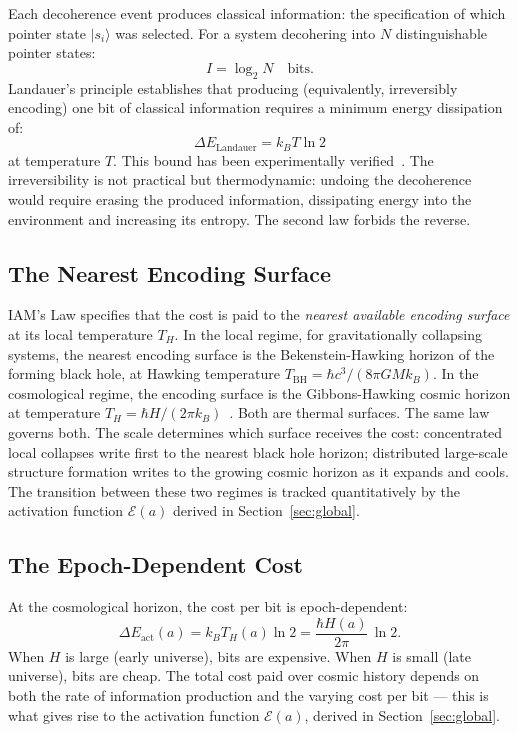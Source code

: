 \documentclass[12pt,a4paper]{article}
\begin{document}
Each decoherence event produces classical information: the specification
of which pointer state $|s_i\rangle$ was selected. For a system
decohering into $N$ distinguishable pointer states:
\begin{equation}
I = \log_2 N \quad \text{bits.}
\label{eq:info_produced}
\end{equation}
Landauer's principle establishes that producing (equivalently,
irreversibly encoding) one bit of classical information requires a
minimum energy dissipation of:
\begin{equation}
\Delta E_\mathrm{Landauer} = k_B T \ln 2
\label{eq:landauer_basic}
\end{equation}
at temperature $T$. This bound has been experimentally
verified~\citep{Berut2012,Jun2014}. The irreversibility is not
practical but thermodynamic: undoing the decoherence would require
erasing the produced information, dissipating energy into the
environment and increasing its entropy. The second law forbids
the reverse.

\subsection{The Nearest Encoding Surface}

IAM's Law specifies that the cost is paid to the \textit{nearest
available encoding surface} at its local temperature $T_H$. In the
local regime, for gravitationally collapsing systems, the nearest
encoding surface is the Bekenstein-Hawking horizon of the forming
black hole, at Hawking temperature $T_\mathrm{BH} = \hbar c^3 /
(8\pi G M k_B)$. In the cosmological regime, the encoding surface
is the Gibbons-Hawking cosmic horizon at temperature $T_H = \hbar H /
(2\pi k_B)$~\citep{Gibbons1977}. Both are thermal surfaces. The same
law governs both. The scale determines which surface receives the cost:
concentrated local collapses write first to the nearest black hole
horizon; distributed large-scale structure formation writes to the
growing cosmic horizon as it expands and cools. The transition between
these two regimes is tracked quantitatively by the activation function
$\mathcal{E}(a)$ derived in Section~\ref{sec:global}.

\subsection{The Epoch-Dependent Cost}

At the cosmological horizon, the cost per bit is epoch-dependent:
\begin{equation}
\Delta E_\mathrm{act}(a) = k_B T_H(a) \ln 2
= \frac{\hbar H(a)}{2\pi}\,\ln 2.
\label{eq:epoch_cost}
\end{equation}
When $H$ is large (early universe), bits are expensive. When $H$ is
small (late universe), bits are cheap. The total cost paid over cosmic
history depends on both the rate of information production and the
varying cost per bit --- this is what gives rise to the activation
function $\mathcal{E}(a)$, derived in Section~\ref{sec:global}.
\end{document}
